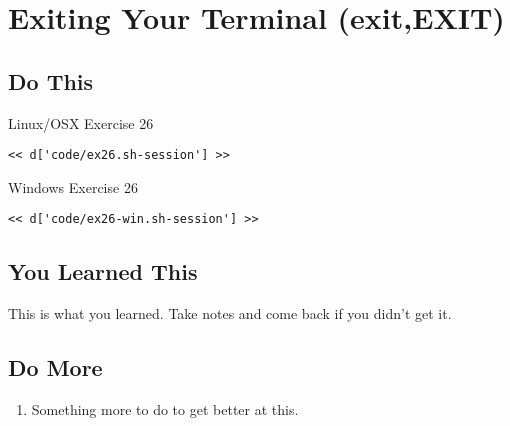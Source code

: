 \chapter{Exiting Your Terminal (exit,EXIT)}

\section{Do This}

\begin{code}{Linux/OSX Exercise 26}
\begin{Verbatim}
<< d['code/ex26.sh-session'] >>
\end{Verbatim}
\end{code}

\begin{code}{Windows Exercise 26}
\begin{Verbatim}
<< d['code/ex26-win.sh-session'] >>
\end{Verbatim}
\end{code}

\section{You Learned This}

This is what you learned.  Take notes and come back if you didn't get it.

\section{Do More}

\begin{enumerate}
\item Something more to do to get better at this.
\end{enumerate}

